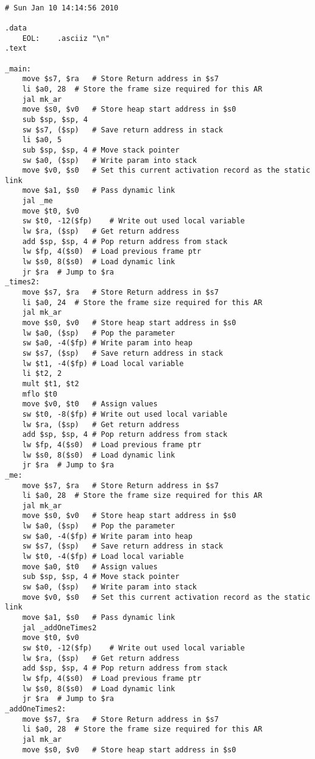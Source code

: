 \begin{lstlisting}[showstringspaces=false,breaklines=true,backgroundcolor=\color{light-gray}, captionpos=b]
         
# Sun Jan 10 14:14:56 2010

.data
	EOL:	.asciiz "\n"
.text

_main:
	move $s7, $ra	# Store Return address in $s7
	li $a0, 28	# Store the frame size required for this AR
	jal mk_ar
	move $s0, $v0	# Store heap start address in $s0
	sub $sp, $sp, 4
	sw $s7, ($sp)	# Save return address in stack
	li $a0, 5
	sub $sp, $sp, 4	# Move stack pointer
	sw $a0, ($sp)	# Write param into stack
	move $v0, $s0	# Set this current activation record as the static link
	move $a1, $s0	# Pass dynamic link
	jal _me
	move $t0, $v0
	sw $t0, -12($fp)	# Write out used local variable
	lw $ra, ($sp)	# Get return address
	add $sp, $sp, 4	# Pop return address from stack
	lw $fp, 4($s0)	# Load previous frame ptr
	lw $s0, 8($s0)	# Load dynamic link
	jr $ra	# Jump to $ra
_times2:
	move $s7, $ra	# Store Return address in $s7
	li $a0, 24	# Store the frame size required for this AR
	jal mk_ar
	move $s0, $v0	# Store heap start address in $s0
	lw $a0, ($sp)	# Pop the parameter
	sw $a0, -4($fp)	# Write param into heap
	sw $s7, ($sp)	# Save return address in stack
	lw $t1, -4($fp)	# Load local variable
	li $t2, 2
	mult $t1, $t2
	mflo $t0
	move $v0, $t0	# Assign values
	sw $t0, -8($fp)	# Write out used local variable
	lw $ra, ($sp)	# Get return address
	add $sp, $sp, 4	# Pop return address from stack
	lw $fp, 4($s0)	# Load previous frame ptr
	lw $s0, 8($s0)	# Load dynamic link
	jr $ra	# Jump to $ra
_me:
	move $s7, $ra	# Store Return address in $s7
	li $a0, 28	# Store the frame size required for this AR
	jal mk_ar
	move $s0, $v0	# Store heap start address in $s0
	lw $a0, ($sp)	# Pop the parameter
	sw $a0, -4($fp)	# Write param into heap
	sw $s7, ($sp)	# Save return address in stack
	lw $t0, -4($fp)	# Load local variable
	move $a0, $t0	# Assign values
	sub $sp, $sp, 4	# Move stack pointer
	sw $a0, ($sp)	# Write param into stack
	move $v0, $s0	# Set this current activation record as the static link
	move $a1, $s0	# Pass dynamic link
	jal _addOneTimes2
	move $t0, $v0
	sw $t0, -12($fp)	# Write out used local variable
	lw $ra, ($sp)	# Get return address
	add $sp, $sp, 4	# Pop return address from stack
	lw $fp, 4($s0)	# Load previous frame ptr
	lw $s0, 8($s0)	# Load dynamic link
	jr $ra	# Jump to $ra
_addOneTimes2:
	move $s7, $ra	# Store Return address in $s7
	li $a0, 28	# Store the frame size required for this AR
	jal mk_ar
	move $s0, $v0	# Store heap start address in $s0

\end{lstlisting}
